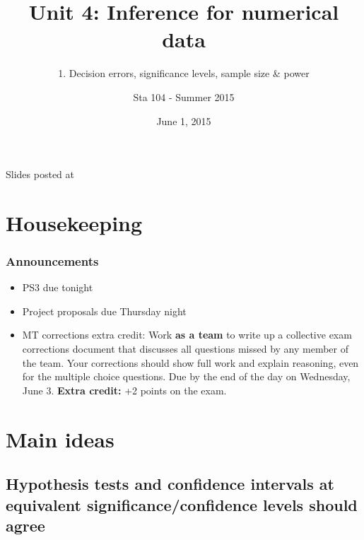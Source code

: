 \documentclass[11pt,containsverbatim,handout,xcolor=xelatex,dvipsnames,table]{beamer}
\title{Unit 4: Inference for numerical data}
\subtitle{1. Decision errors, significance levels, sample size \& power}
\author{Sta 104 - Summer 2015}
\date{June 1, 2015}
\institute{Duke University, Department of Statistical Science}
\begin{document}



\begin{frame}[plain]

\titlepage
\vfill
{\scriptsize {} \hfill Slides posted at  \webLink{\CourseSite}{\CourseSite}}
\addtocounter{framenumber}{-1} 

\end{frame}


\section{Housekeeping}


\begin{frame}
\frametitle{Announcements}

\begin{itemize}

\item PS3 due tonight

\item Project proposals due Thursday night

\item MT corrections extra credit: Work \textbf{as a team} to write up a collective exam corrections document that discusses all questions missed by any member of the team. Your corrections should show full work and explain reasoning, even for the multiple choice questions. Due by the end of the day on Wednesday, June 3. \textbf{Extra credit:} +2 points on the exam.

\end{itemize}

\end{frame}


\section{Main ideas}


\subsection{Hypothesis tests and confidence intervals at equivalent significance/confidence levels should agree}
\label{mi1dec}
\end{document}
